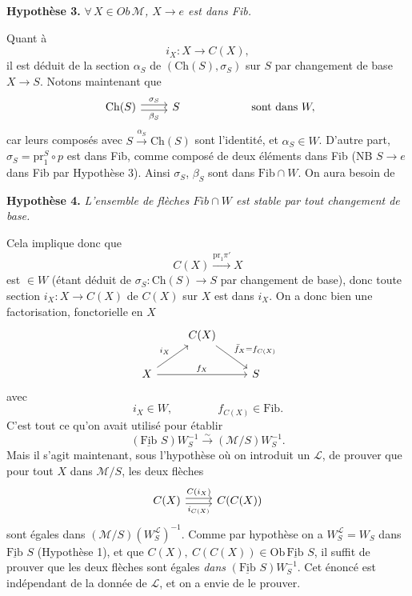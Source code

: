 \documentclass[11pt]{article}
\newcommand{\printedpage}[1]{\marginpar{\footnotesize p.~#1}}
\newcommand{\msp}[1]{\marginpar{\footnotesize [#1]}}
\newcommand{\Fib}{\underline{\mathrm{Fib}}\,}
\newcommand{\Ch}{\mathrm{Ch}}
\newcommand{\pr}{\mathrm{pr}}
\begin{document}
\textbf{Hypothèse 3.} \textit{$\forall\,X\in\mathit{Ob}\,\mathcal{M}$, $X\longrightarrow e$ est dans Fib.}

Quant à
\[
i_X : X\longrightarrow C(X),
\]
il est déduit de la section $\alpha_S$ de $(\Ch(S),\sigma_S)$ sur $S$ par changement de base $X\longrightarrow S$. Notons maintenant que
\[
\begin{tikzcd}
\Ch(S) \arrow[r, shift left, "\sigma_S"] \arrow[r, shift right, "\beta_S"'] & S
\end{tikzcd}
\qquad\qquad\qquad \text{sont dans } W,
\]
car leurs composés avec $S\xrightarrow{\alpha_S}\Ch(S)$ sont l'identité, et $\alpha_S\in W$. D'autre part, $\sigma_S=\pr_1^S\circ p$ est dans Fib, comme composé de deux éléments dans Fib (NB $S\longrightarrow e$ dans Fib par Hypothèse 3). Ainsi $\sigma_S$, $\beta_S$ sont dans $\mathrm{Fib}\cap W$. On aura besoin de %

\textbf{Hypothèse 4.} \textit{L'ensemble de flèches $\mathit{Fib}\cap W$ est stable par tout changement de base.}


\printedpage{65}

\msp{page 103}
Cela implique donc que
\[
C(X)\xrightarrow{\pr_1\pi'}X
\]
 est $\in W$ (étant déduit de $\sigma_S : \Ch(S)\longrightarrow S$ par changement de base), donc toute section $i_X : X\longrightarrow C(X)$ de $C(X)$ sur $X$ est dans $i_X$. On a donc bien une factorisation, fonctorielle en $X$
\[
\begin{tikzcd}
 & C(X) \arrow[dr, "\bar f_X=f_{C(X)}"] & \\
X \arrow[ur, "i_X"] \arrow[rr, "f_X"] & & S
\end{tikzcd}
\]
avec
\[
i_X\in W,\qquad\qquad f_{C(X)}\in\mathrm{Fib}.
\]
C'est tout ce qu'on avait utilisé pour établir
\[
(\Fib\,S)W_S^{-1}\xrightarrow{\sim}(\mathcal{M}/S)W_S^{-1}.
\]
Mais il s'agit maintenant, sous l'hypothèse où on introduit un $\mathcal{L}$, de prouver que pour tout $X$ dans $\mathcal{M}/S$, les deux flèches
\[
\begin{tikzcd}
C(X) \arrow[r, shift left, "C(i_X)"] \arrow[r, shift right, "i_{C(X)}"'] & C(C(X))
\end{tikzcd}
\]
sont égales dans $(\mathcal{M}/S)(W_S^{\mathcal{L}})^{-1}$. Comme par hypothèse on a $W_S^{\mathcal{L}}=W_S$ dans $\Fib\,S$ (Hypothèse 1), et que $C(X),\ C(C(X))\in\mathrm{Ob}\,\Fib\,S$,
\msp{page 104}
il suffit de prouver que les deux flèches sont égales \textit{dans} $(\Fib\,S)W_S^{-1}$. Cet énoncé est indépendant de la donnée de $\mathcal{L}$, et on a envie de le prouver.
\end{document}
